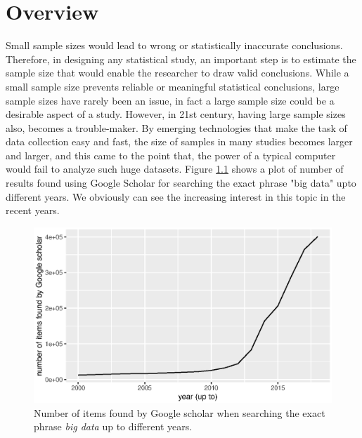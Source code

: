 \documentclass[11pt,a5paper,twoside]{book}
\newcommand{\clearemptydoublepage}%
        {\newpage{\pagestyle{empty}\cleardoublepage}}
\begin{document}

 \frontmatter
 
 
 \thispagestyle{empty}
\tableofcontents
\listoffigures
\listoftables


\clearemptydoublepage
\mainmatter

\clearemptydoublepage

\chapter[Overview]{Overview}
\label{sec_intro1}

Small sample sizes would lead to wrong or statistically inaccurate conclusions. Therefore, in designing any statistical study, an important step is to estimate the sample size that would enable the researcher to draw valid conclusions. While a small sample size prevents reliable or meaningful statistical conclusions, large sample sizes have rarely been an issue, in fact a large sample size could be a desirable aspect of a study. However, in 21st century, having large sample sizes also, becomes a trouble-maker. By emerging technologies that make the task of data collection easy and fast, the size of samples in many studies becomes larger and larger, and this came to the point that, the power of a typical computer would fail to analyze such huge datasets. Figure \ref{fig_bigdata} shows a plot of number of results found using Google Scholar for searching the exact phrase "big data" upto different years. We obviously can see the increasing interest in this topic in the recent years.




\begin{figure}
\centering
\includegraphics[width=\textwidth]{bigdata.eps}
\caption{Number of items found by Google scholar when searching the exact phrase \emph{big data} up to different years.} 
\label{fig_bigdata}
\end{figure} 
\end{document}
